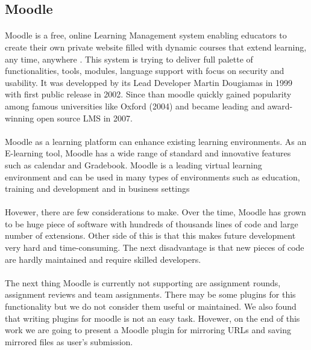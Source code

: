 \subsection{Moodle}
\paragraph{}
Moodle is a free, online Learning Management system enabling educators to create their own private website filled with dynamic courses that extend learning, any time, anywhere \cite{moodlesite}. This system is trying to deliver full palette of functionalities, tools, modules, language support with focus on security and usability. It was developped by its Lead Developer Martin Dougiamas in 1999 with first public release in 2002. Since than moodle quickly gained popularity among famous universities like Oxford (2004) and became leading and award-winning open source LMS in 2007. \cite{moodlesite}

\paragraph{}
Moodle as a learning platform can enhance existing learning environments. As an E-learning tool, Moodle has a wide range of standard and innovative features such as calendar and Gradebook. Moodle is a leading virtual learning environment and can be used in many types of environments such as education, training and development and in business settings \cite{moodlesite}



\paragraph{}
Hovewer, there are few considerations to make. Over the time, Moodle has grown to be huge piece of software with hundreds of thousands lines of code and large number of extensions. Other side of this is that this makes future development very hard and time-consuming. The next disadvantage is that new pieces of code are hardly maintained and require skilled developers.

\paragraph{}
The next thing Moodle is currently not supporting are assignment rounds, assignment reviews and team assignments. There may be some plugins for this functionality but we do not consider them useful or maintained. We also found that writing plugins for moodle is not an easy task. Hovewer, on the end of this work we are going to present a Moodle plugin for mirroring URLs and saving mirrored files as user's submission.

